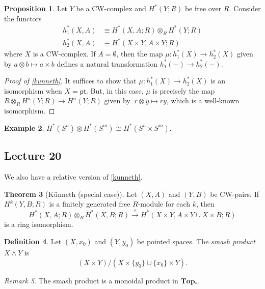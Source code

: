 \documentclass[10pt,letterpaper,cm]{nupset}
\theoremstyle{definition}
\newtheorem{definition}{Definition}[subsection]
\newtheorem{exmp}[definition]{Example}
\theoremstyle{theorem}
\newtheorem{theorem}[definition]{Theorem}
\newtheorem{prop}[definition]{Proposition}
\theoremstyle{remark}
\newtheorem{remark}[definition]{Remark}
\newcommand{\1}{\mathbb{1}}
\newcommand{\0}{\vec 0}
\newcommand{\pt}{\mathsf{pt}}
\begin{document}
\begin{prop}
Let $Y$ be a CW-complex and $H^{\ast}(Y; R)$ be free over $R$. Consider the functors 
\begin{align*} h^{\ast}_1(X, A)&  \equiv H^{\ast}(X, A; R) \otimes_R H^{\ast}(Y; R) \\ h_2^{\ast}(X, A) & \equiv H^{\ast}(X \times Y, A \times Y; R)
 \end{align*} where $X$ is a CW-complex. If $A= \emptyset$, then the map $\mu : h_1^{\ast}(X) \to h_2^{\ast}(X)$ given by $a \otimes b \mapsto a \times b$ defines a natural transformation $h_1^{\ast}({-}) \to h_2^{\ast}({-})$. 
\end{prop}

\begin{proof}[Proof of \cref{kunneth}]
It suffices to show that $\mu : h_1^{\ast}(X) \to h_2^{\ast}(X)$ is an isomorphism when $X = \pt$. But, in this case, $\mu$ is precisely the map $R\otimes_R H^n(Y; R) \to H^n(Y; R)$ given by $\ r \otimes y \mapsto ry$, which is a well-known isomorphism.  
\end{proof}

\begin{exmp}
 $H^{\ast}(S^n) \otimes  H^{\ast}(S^m) \cong H^{\ast}(S^n \times S^m)$.
 \end{exmp}

\subsection{Lecture 20}

We also have a relative version of \cref{kunneth}.

\begin{theorem}[K\"unneth (special case)]
Let $\left(X, A\right)$ and $\left(Y, B\right)$ be CW-pairs. If $H^k(Y, B; R)$ is a finitely generated free $R$-module for each $k$, then $$ H^{\ast}(X, A; R) \otimes_R H^{\ast}(X, B; R) \overset{\times}{\longrightarrow} H^{\ast}(X \times Y, A \times Y \cup X \times B; R)$$ is a ring isomorphism. 
\end{theorem}

\begin{definition}
Let $\left(X, x_0\right)$ and $\left(Y, y_0\right)$ be pointed spaces. The \textit{smash product $X \wedge Y$} is $$\left(X \times Y\right)/\left(X \times \{y_0\} \cup \{x_0\} \times Y\right).$$
\end{definition}

\begin{remark}
The smash product is a monoidal product in $\mathbf{Top}_{\ast}$.
\end{remark}
\end{document}
